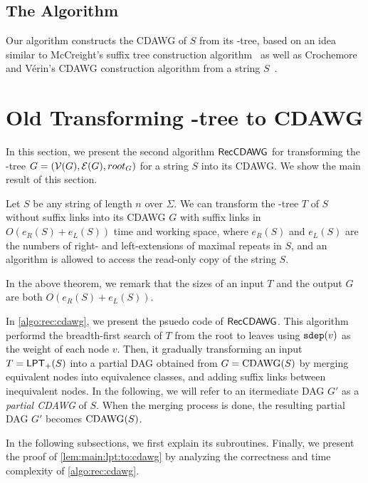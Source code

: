 \subsection{The Algorithm}

Our algorithm constructs the CDAWG of $S$ from its \LPTrm-tree, based on an idea similar to McCreight's suffix tree construction algorithm~\cite{mccreight1976space} as well as Crochemore and V\'erin's CDAWG construction algorithm from a string $S$~\cite{crochemore:verin1997direct}. 



\section*{Old Transforming \LPTrm-tree to CDAWG}
\label{sec:lpt:to:cdawg:old}
In this section, we present the second algorithm $\textsf{RecCDAWG}$ for transforming the \LPTrm-tree $G = (\mathcal{V}(G), \mathcal{E}(G), root_G)$ for a string $S$ into its CDAWG.
We show the main result of this section.  

\begin{lemma}\label{lem:main:lpt:to:cdawg}
  Let $S$ be any string of length $n$ over $\Sigma$. 
  We can transform the \LPTrm-tree $T$ of $S$ without suffix links into its CDAWG $G$ with suffix links in $O(e_R(S) + e_L(S))$ time and working space, where $e_R(S)$ and $e_L(S)$ are the numbers of right- and left-extensions of maximal repeats in $S$, and an algorithm is allowed to access the read-only copy of the string $S$. 
\end{lemma}

In the above theorem, we remark that the sizes of an input $T$ and the output $G$ are both $O(e_R(S) + e_L(S))$. 

In \cref{algo:rec:cdawg}, we present the psuedo code of $\textsf{RecCDAWG}$. 
This algorithm performd the breadth-first search of $T$ from the root to leaves using $\mathtt{sdep}(v)$ as the weight of each node $v$. Then, it gradually transforming an input $T = \mathsf{LPT}_{+}(S)$ into a partial DAG obtained from $G = \mathrm{CDAWG}(S)$ by merging equivalent nodes into equivalence classes, and adding suffix links between inequivalent nodes. In the following, we will refer to an itermediate DAG $G'$ as a \textit{partial CDAWG} of $S$. When the merging process is done, the resulting partial DAG $G'$ becomes $\mathrm{CDAWG}(S)$.


In the following subsections, we first explain its subroutines. Finally, we present the proof of \cref{lem:main:lpt:to:cdawg} by analyzing the correctness and time complexity of \cref{algo:rec:cdawg}. 

